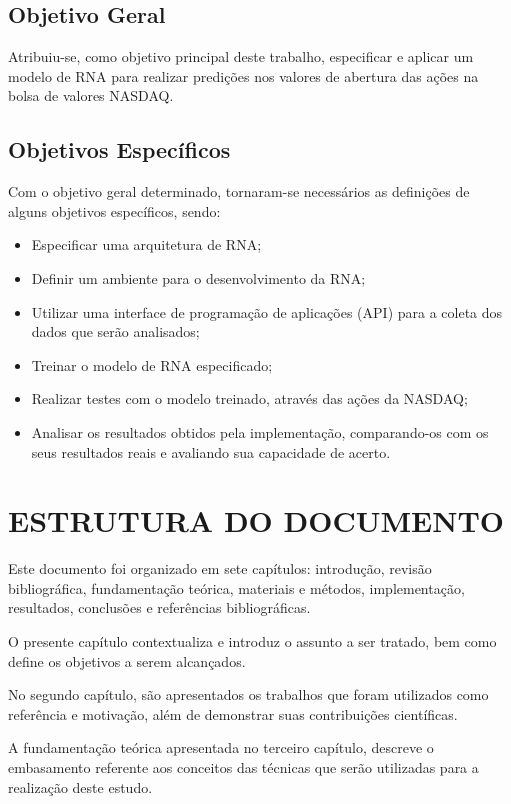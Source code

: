 \subsection{Objetivo Geral} 
Atribuiu-se, como objetivo principal deste trabalho, especificar e aplicar um modelo de RNA para realizar predições nos valores de abertura das ações na bolsa de valores NASDAQ.

\subsection{Objetivos Específicos}\label{subsec:objetivos_especificos}
Com o objetivo geral determinado, tornaram-se necessários as definições de alguns objetivos específicos, sendo:
\begin{itemize}
	\item Especificar uma arquitetura de RNA;
	\item Definir um ambiente para o desenvolvimento da RNA;
	\item Utilizar uma interface de programação de aplicações (API) para a coleta dos dados que serão analisados;
	\item Treinar o modelo de RNA especificado;
	\item Realizar testes com o modelo treinado, através das ações da NASDAQ;
	\item Analisar os resultados obtidos pela implementação, comparando-os com os seus resultados reais e avaliando sua capacidade de acerto.
\end{itemize}

\section{ESTRUTURA DO DOCUMENTO}\label{sec:organizacao-trabalho}
Este documento foi organizado em sete capítulos: introdução, revisão bibliográfica, fundamentação teórica, materiais e métodos, implementação, resultados, conclusões e referências bibliográficas.

O presente capítulo contextualiza e introduz o assunto a ser tratado, bem como define os objetivos a serem alcançados.

No segundo capítulo, são apresentados os trabalhos que foram utilizados como referência e motivação, além de demonstrar suas contribuições científicas.

A fundamentação teórica apresentada no terceiro capítulo, descreve o embasamento referente aos conceitos das técnicas que serão utilizadas para a realização deste estudo.

